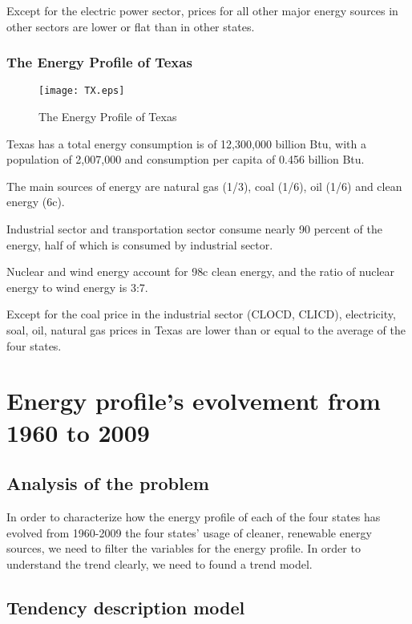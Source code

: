  
 Except for the electric power sector, prices for all other major energy sources in other sectors are lower or flat than in other states.

\newpage
\subsubsection{The Energy Profile of Texas}

\begin{figure}[h]

\centering
\texttt{[image: TX.eps]}
\caption{The Energy Profile of Texas} \label{fig:aa}
\end{figure}
Texas has a total energy consumption is of 12,300,000 billion Btu, with a population of 2,007,000 and consumption per capita of 0.456 billion Btu. 


The main sources of energy are natural gas (1/3), coal (1/6), oil (1/6) and clean energy (6c). 


Industrial sector and transportation sector consume nearly 90 percent of the energy, half of which is consumed by industrial sector. 


Nuclear and wind energy account for 98c clean energy, and the ratio of nuclear energy to wind energy is 3:7. 


Except for the coal price in the industrial sector (CLOCD, CLICD),  electricity, soal, oil, natural gas prices in Texas are lower than or equal to the average of the four states.


\newpage

\section{Energy profile's evolvement from 1960 to 2009}

\subsection{Analysis of the problem}

In order to characterize how the energy profile of each of the four states has evolved from 1960-2009 the four states' usage of cleaner, renewable energy sources, we need to filter the variables for the energy profile. In order to understand the trend clearly, we  need to found a trend model.



\subsection{Tendency description model}

